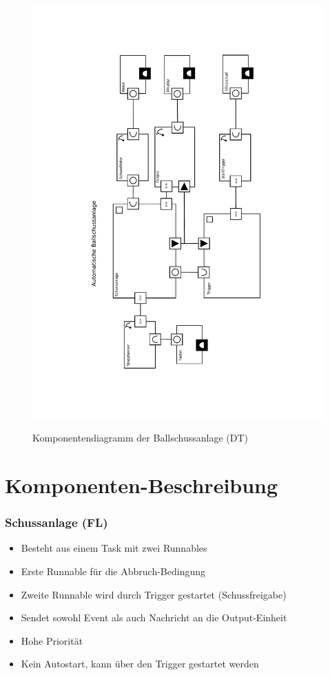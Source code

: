 \documentclass[a4paper,11pt]{scrreprt}
\begin{document}
\begin{figure}[htbp]
 \centering
 \includegraphics[scale=.75]{./KomponentenDiagramm.pdf}
 \label{fig:komponentendiag}
 \caption{Komponentendiagramm der Ballschussanlage (DT)}
\end{figure}

\chapter{Komponenten-Beschreibung}

\subsection*{Schussanlage (FL)}

\begin{itemize}
 \item Besteht aus einem Task mit zwei Runnables
 \item Erste Runnable für die Abbruch-Bedingung
 \item Zweite Runnable wird durch Trigger gestartet (Schussfreigabe)
 \item Sendet sowohl Event als auch Nachricht an die Output-Einheit
 \item Hohe Priorität
 \item Kein Autostart, kann über den Trigger gestartet werden
\end{itemize}
\end{document}
